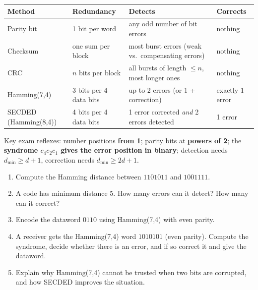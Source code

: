 \documentclass[11pt]{article}
\begin{document}
\begin{aretenir}
\begin{center}
\begin{tabularx}{\linewidth}{|l|X|X|X|}
\hline
\rowcolor{popblueL} Method & Redundancy & Detects & Corrects \\
\hline
Parity bit & 1 bit per word & any odd number of bit errors & nothing \\
\hline
Checksum & one sum per block & most burst errors (weak vs.\ compensating errors) & nothing \\
\hline
CRC & $n$ bits per block & all bursts of length $\leq n$, most longer ones & nothing \\
\hline
Hamming(7,4) & 3 bits per 4 data bits & up to 2 errors (or 1 + correction) & exactly 1 error \\
\hline
SECDED (Hamming(8,4)) & 4 bits per 4 data bits & 1 error corrected \emph{and} 2 errors detected & 1 error \\
\hline
\end{tabularx}
\end{center}
Key exam reflexes: number positions \textbf{from 1}; parity bits at \textbf{powers of 2}; the \textbf{syndrome $c_4c_2c_1$ gives the error position in binary}; detection needs $d_{\min} \geq d+1$, correction needs $d_{\min} \geq 2d+1$.
\end{aretenir}

\begin{exercice}[Practice]
\begin{enumerate}
\item Compute the Hamming distance between $1101011$ and $1001111$.
\item A code has minimum distance $5$. How many errors can it detect? How many can it correct?
\item Encode the dataword $0110$ using Hamming(7,4) with even parity.
\item A receiver gets the Hamming(7,4) word $1010101$ (even parity). Compute the syndrome, decide whether there is an error, and if so correct it and give the dataword.
\item Explain why Hamming(7,4) cannot be trusted when two bits are corrupted, and how SECDED improves the situation.
\end{enumerate}
\end{exercice}
\end{document}
